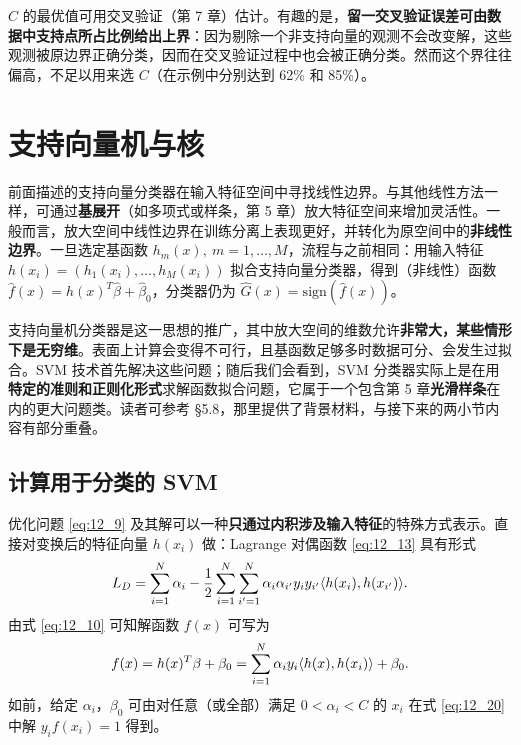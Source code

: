 \begin{remark}[留一交叉验证误差的界]
$C$ 的最优值可用交叉验证（第 7 章）估计。有趣的是，\textbf{留一交叉验证误差可由数据中支持点所占比例给出上界}：因为剔除一个非支持向量的观测不会改变解，这些观测被原边界正确分类，因而在交叉验证过程中也会被正确分类。然而这个界往往偏高，不足以用来选 $C$（在示例中分别达到 62\% 和 85\%）。
\end{remark}

\section{支持向量机与核}

前面描述的支持向量分类器在输入特征空间中寻找线性边界。与其他线性方法一样，可通过\textbf{基展开}（如多项式或样条，第 5 章）放大特征空间来增加灵活性。一般而言，放大空间中线性边界在训练分离上表现更好，并转化为原空间中的\textbf{非线性边界}。一旦选定基函数 $h_m(x),\ m=1,\dots,M$，流程与之前相同：用输入特征 $h(x_i)=(h_1(x_i),\dots,h_M(x_i))$ 拟合支持向量分类器，得到（非线性）函数 $\hat f(x) = h(x)^T\hat\beta + \hat\beta_0$，分类器仍为 $\hat G(x)=\mathrm{sign}(\hat f(x))$。

\begin{remark}
支持向量机分类器是这一思想的推广，其中放大空间的维数允许\textbf{非常大，某些情形下是无穷维}。表面上计算会变得不可行，且基函数足够多时数据可分、会发生过拟合。SVM 技术首先解决这些问题；随后我们会看到，SVM 分类器实际上是在用\textbf{特定的准则和正则化形式}求解函数拟合问题，它属于一个包含第 5 章\textbf{光滑样条}在内的更大问题类。读者可参考 §5.8，那里提供了背景材料，与接下来的两小节内容有部分重叠。
\end{remark}

\subsection{计算用于分类的 SVM}

优化问题 \ref{eq:12_9} 及其解可以一种\textbf{只通过内积涉及输入特征}的特殊方式表示。直接对变换后的特征向量 $h(x_i)$ 做：Lagrange 对偶函数 \ref{eq:12_13} 具有形式
\begin{equation}
L_D = \sum_{i=1}^{N}\alpha_i - \frac12 \sum_{i=1}^{N}\sum_{i'=1}^{N}\alpha_i \alpha_{i'} y_i y_{i'} \langle h(x_i),h(x_{i'})\rangle. \label{eq:12_19}
\end{equation}
由式 \ref{eq:12_10} 可知解函数 $f(x)$ 可写为
\begin{equation}
f(x) = h(x)^T\beta + \beta_0 = \sum_{i=1}^{N}\alpha_i y_i \langle h(x),h(x_i)\rangle + \beta_0. \label{eq:12_20}
\end{equation}
如前，给定 $\alpha_i$，$\beta_0$ 可由对任意（或全部）满足 $0<\alpha_i<C$ 的 $x_i$ 在式 \ref{eq:12_20} 中解 $y_i f(x_i)=1$ 得到。

